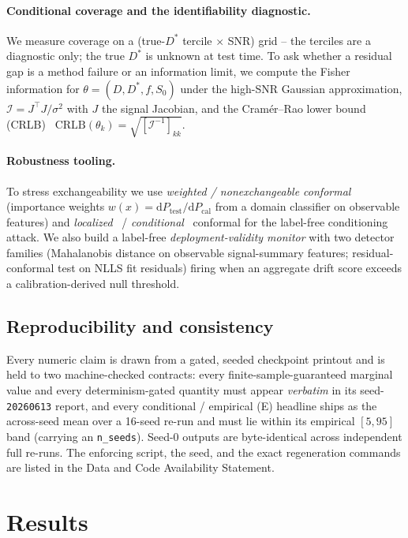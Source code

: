\documentclass[11pt]{article}
\newcommand{\Dstar}{D^{*}}
\begin{document}
\paragraph{Conditional coverage and the identifiability diagnostic.}
We measure coverage on a (true-$\Dstar$ tercile $\times$ SNR) grid -- the terciles
are a diagnostic only; the true $\Dstar$ is unknown at test time. To ask whether a
residual gap is a method failure or an information limit, we compute the Fisher
information for $\theta=(D,\Dstar,f,S_0)$ under the high-SNR Gaussian approximation,
$\mathcal{I}=J^\top J/\sigma^2$ with $J$ the signal Jacobian, and the
Cram\'er--Rao lower bound (CRLB)~\citep{cramer1946}
$\mathrm{CRLB}(\theta_k)=\sqrt{[\mathcal{I}^{-1}]_{kk}}$.

\paragraph{Robustness tooling.}
To stress exchangeability we use \emph{weighted / nonexchangeable
conformal}~\citep{tibshirani2019,barber2023} (importance weights
$w(x)=\mathrm{d}P_{\text{test}}/\mathrm{d}P_{\text{cal}}$ from a domain classifier on
observable features) and \emph{localized}~\citep{guan2023} /
\emph{conditional}~\citep{gibbs2023} conformal for the label-free conditioning attack.
We also build a label-free \emph{deployment-validity monitor} with two detector
families (Mahalanobis distance on observable signal-summary features;
residual-conformal test on NLLS fit residuals) firing when an aggregate drift score
exceeds a calibration-derived null threshold.

\subsection{Reproducibility and consistency}
\label{sec:consistency}
Every numeric claim is drawn from a gated, seeded checkpoint printout and is held to
two machine-checked contracts: every finite-sample-guaranteed marginal value and
every determinism-gated quantity must appear \emph{verbatim} in its
seed-\texttt{20260613} report, and every conditional / empirical (E) headline ships
as the across-seed mean over a 16-seed re-run and must lie within its empirical
$[5,95]$ band (carrying an \texttt{n\_seeds}). Seed-0 outputs are byte-identical
across independent full re-runs. The enforcing script, the seed, and the exact
regeneration commands are listed in the Data and Code Availability Statement.

\section{Results}
\end{document}
